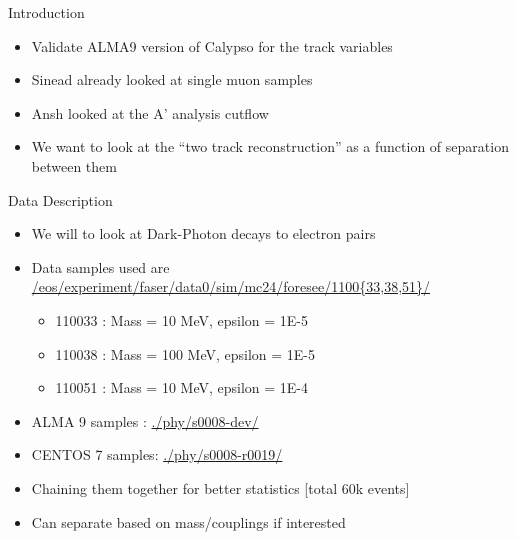 \begin{frame}{Introduction}
    \begin{itemize}
        \item Validate ALMA9 version of Calypso for the track variables
        \item Sinead already looked at single muon samples
        \item Ansh looked at the A' analysis cutflow
        \item We want to look at the ``two track reconstruction'' as a function of separation between them
    \end{itemize}
\end{frame}

\begin{frame}{Data Description}
    \begin{itemize}
        \item We will to look at Dark-Photon decays to electron pairs
        \item Data samples used are \href{/eos/experiment/faser/data0/sim/mc24/foresee/1100*/phy/}{\small /eos/experiment/faser/data0/sim/mc24/foresee/1100\{33,38,51\}/}
        \begin{itemize}
            \item 110033 : Mass = 10  MeV, epsilon = 1E-5 
            \item 110038 : Mass = 100 MeV, epsilon = 1E-5 
            \item 110051 : Mass = 10  MeV, epsilon = 1E-4 
        \end{itemize}
        \item ALMA 9 samples : \href{./phy/s0008-dev/}{./phy/s0008-dev/} 
        \item CENTOS 7 samples: \href{./phy/s0008-r0019/}{./phy/s0008-r0019/}
        \item Chaining them together  for better statistics [total 60k events]
        \item Can separate based on mass/couplings if interested
    \end{itemize}
    
\end{frame}

